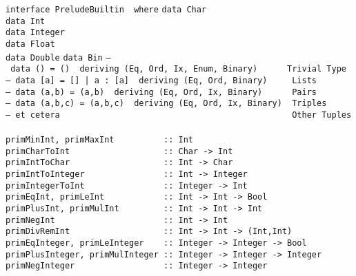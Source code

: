 \noindent\bprogB
\mbox{\tt interface\ PreludeBuiltin\ \ where}
\eprogB\noindent\bprogB
\mbox{\tt data\ Char}\\
\mbox{\tt data\ Int}\\
\mbox{\tt data\ Integer}\\
\mbox{\tt data\ Float}\\
\mbox{\tt data\ Double}
\eprogB\noindent\bprogB
\mbox{\tt data\ Bin}
\eprogB\noindent\bprogB
\mbox{\tt --\ data\ ()\ =\ ()\ \ deriving\ (Eq,\ Ord,\ Ix,\ Enum,\ Binary)\ \ \ \ \ \ Trivial\ Type}\\
\mbox{\tt --\ data\ [a]\ =\ []\ |\ a\ :\ [a]\ \ deriving\ (Eq,\ Ord,\ Binary)\ \ \ \ \ Lists}\\
\mbox{\tt --\ data\ (a,b)\ =\ (a,b)\ \ deriving\ (Eq,\ Ord,\ Ix,\ Binary)\ \ \ \ \ \ Pairs}\\
\mbox{\tt --\ data\ (a,b,c)\ =\ (a,b,c)\ \ deriving\ (Eq,\ Ord,\ Ix,\ Binary)\ \ Triples}\\
\mbox{\tt --\ et\ cetera\ \ \ \ \ \ \ \ \ \ \ \ \ \ \ \ \ \ \ \ \ \ \ \ \ \ \ \ \ \ \ \ \ \ \ \ \ \ \ \ \ \ \ \ \ \ \ Other\ Tuples}\\
\mbox{\tt }\\
\mbox{\tt primMinInt,\ primMaxInt\ \ \ \ \ \ \ \ \ \ ::\ Int}\\
\mbox{\tt primCharToInt\ \ \ \ \ \ \ \ \ \ \ \ \ \ \ \ \ \ \ ::\ Char\ ->\ Int}\\
\mbox{\tt primIntToChar\ \ \ \ \ \ \ \ \ \ \ \ \ \ \ \ \ \ \ ::\ Int\ ->\ Char}\\
\mbox{\tt primIntToInteger\ \ \ \ \ \ \ \ \ \ \ \ \ \ \ \ ::\ Int\ ->\ Integer}\\
\mbox{\tt primIntegerToInt\ \ \ \ \ \ \ \ \ \ \ \ \ \ \ \ ::\ Integer\ ->\ Int}
\eprogB\noindent\bprogB
\mbox{\tt primEqInt,\ primLeInt\ \ \ \ \ \ \ \ \ \ \ \ ::\ Int\ ->\ Int\ ->\ Bool}\\
\mbox{\tt primPlusInt,\ primMulInt\ \ \ \ \ \ \ \ \ ::\ Int\ ->\ Int\ ->\ Int}\\
\mbox{\tt primNegInt\ \ \ \ \ \ \ \ \ \ \ \ \ \ \ \ \ \ \ \ \ \ ::\ Int\ ->\ Int}\\
\mbox{\tt primDivRemInt\ \ \ \ \ \ \ \ \ \ \ \ \ \ \ \ \ \ \ ::\ Int\ ->\ Int\ ->\ (Int,Int)}
\eprogB\noindent\bprogB
\mbox{\tt primEqInteger,\ primLeInteger\ \ \ \ ::\ Integer\ ->\ Integer\ ->\ Bool}\\
\mbox{\tt primPlusInteger,\ primMulInteger\ ::\ Integer\ ->\ Integer\ ->\ Integer}\\
\mbox{\tt primNegInteger\ \ \ \ \ \ \ \ \ \ \ \ \ \ \ \ \ \ ::\ Integer\ ->\ Integer}\\
